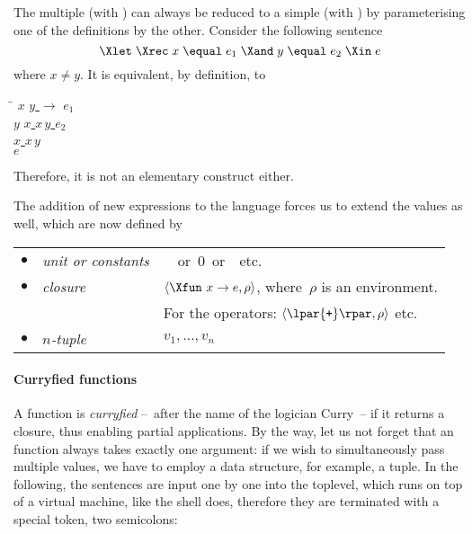 The multiple \Xlet{} \Xrec{} (with \Xand) can always be reduced to a
simple \Xlet{} \Xrec{} (with \Xin) by parameterising one of the
definitions by the other. Consider the following sentence
\begin{equation*}
\Xlet \; \Xrec \; x \; \equal \; e_1 \; \Xand \; y \; \equal \; e_2 \;
\Xin \; e
\end{equation*}
where $x \neq y$. It is equivalent, by definition, to
\begin{center}
\begin{minipage}{0.3\linewidth}
\begin{tabbing}
\Xlet{} \= \Xrec{} $x$ \equal{} \underline{\Xfun{} $y$
  $\rightarrow$} $e_1$ \Xin\\
\> \Xlet{} \Xrec{} $y$ \equal{} \underline{\Xlet{} $x$ \equal{} $x \,
y$ \Xin} $e_2$ \Xin\\
\> \underline{\Xlet{} $x$ \equal{} $x \, y$}\\
\underline{\Xin} $e$
\end{tabbing}
\end{minipage}
\end{center}
Therefore, it is not an elementary construct either.

The addition of new expressions to the language forces us to extend
the values as well, which are now defined by

\bigskip

\begin{tabular}{rll}
    $\bullet$
  & \emph{unit or constants}
  & \unit \ or \textsf{0} or \Xtrue{} etc.\\
    $\bullet$
  & \emph{closure}
  & $\langle\Xfun \,\, x \rightarrow e, \rho\rangle$, where~$\rho$ is
    an environment.\\
  &
  & For the operators: $\langle\lpar{\texttt{+}}\rpar, \rho\rangle$
    etc.\\
    $\bullet$
  & \emph{$n$-tuple}
  & $v_1, \ldots, v_n$
\end{tabular}

\bigskip

\paragraph{Curryfied functions}

A function is \emph{curryfied} --~after the name of the logician
Curry~-- if it returns a closure, thus enabling partial
applications. By the way, let us not forget that an \OCaml function
always takes exactly one argument: if we wish to simultaneously pass
multiple values, we have to employ a data structure, for example, a
tuple. In the following, the sentences are input one by one into
the \OCaml toplevel, which runs on top of a virtual machine, like
the \Erlang shell does, therefore they are terminated with a special
token, two semicolons:

